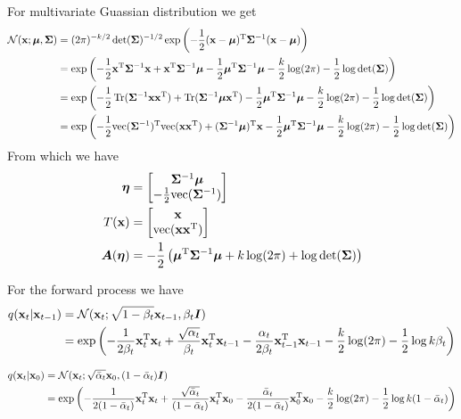 For multivariate Guassian distribution we get \cite{escudero_multivariate_2020}
\begin{align*}
    \mathcal{N}({\mathbf{x}} ; {\bm{\mu}}, {\bm{\Sigma}})
    &= (2 \pi)^{-k / 2} \det({\bm{\Sigma}})^{-1 / 2} \exp \left(-\frac{1}{2}({\mathbf{x}}-{\bm{\mu}})^{\mathrm{T}} {\bm{\Sigma}}^{-1}({\mathbf{x}} - {\bm{\mu}})\right) \\
    &= \exp \left(-\frac{1}{2}{\mathbf{x}}^{\mathrm{T}} {\bm{\Sigma}}^{-1} {\mathbf{x}} + {\mathbf{x}}^{\mathrm{T}} {\bm{\Sigma}}^{-1} {\bm{\mu}} - \frac{1}{2}{\bm{\mu}}^{\mathrm{T}} {\bm{\Sigma}}^{-1} {\bm{\mu}} - \frac{k}{2} \log (2 \pi) - \frac{1}{2} \log \det({\bm{\Sigma}}) \right) \\
    &= \exp \left(-\frac{1}{2} \operatorname{Tr}({\bm{\Sigma}}^{-1} {\mathbf{x}} {\mathbf{x}}^{\mathrm{T}} ) + \operatorname{Tr}( {\bm{\Sigma}}^{-1} {\bm{\mu}} {\mathbf{x}}^{\mathrm{T}} ) - \frac{1}{2}{\bm{\mu}}^{\mathrm{T}} {\bm{\Sigma}}^{-1} {\bm{\mu}} - \frac{k}{2} \log (2 \pi) - \frac{1}{2} \log \det({\bm{\Sigma}}) \right) \\
    &= \exp \left(-\frac{1}{2} \mathrm{vec}({\bm{\Sigma}}^{-1})^{\mathrm{T}} \mathrm{vec}({\mathbf{x}} {\mathbf{x}}^{\mathrm{T}} ) + ({\bm{\Sigma}}^{-1} {\bm{\mu}})^{\mathrm{T}} {\mathbf{x}} - \frac{1}{2}{\bm{\mu}}^{\mathrm{T}} {\bm{\Sigma}}^{-1} {\bm{\mu}} - \frac{k}{2} \log (2 \pi) - \frac{1}{2} \log \det({\bm{\Sigma}}) \right) 
\end{align*}
From which we have 
\begin{align*}
    \bm{\eta} &= \begin{bmatrix}
        {\bm{\Sigma}}^{-1} {\bm{\mu}} \\
        -\frac{1}{2} \mathrm{vec}({\bm{\Sigma}}^{-1})
    \end{bmatrix} \\
    T({\mathbf{x}}) &= \begin{bmatrix}
        {\mathbf{x}} \\
        \mathrm{vec}({\mathbf{x}} {\mathbf{x}}^{\mathrm{T}} )
    \end{bmatrix} \\
    {\bm{A}}(\bm{\eta}) &= - \frac{1}{2} \left( {\bm{\mu}}^{\mathrm{T}} {\bm{\Sigma}}^{-1} {\bm{\mu}} + k \log (2 \pi) + \log \det({\bm{\Sigma}})\right)
\end{align*}

For the forward process we have
\begin{align*}
    q({\mathbf{x}}_{t} | {\mathbf{x}}_{t-1}) &= \mathcal{N}({\mathbf{x}}_{t}; \sqrt{1-\beta_t} {\mathbf{x}}_{t-1}, \beta_t {\bm{I}}) \\
    &= \exp \left(-\frac{1}{2\beta_t} {\mathbf{x}}_t^{\mathrm{T}} {\mathbf{x}}_t + \frac{\sqrt{\alpha_t}}{\beta_t} {\mathbf{x}}_t^{\mathrm{T}} {\mathbf{x}}_{t-1} - \frac{\alpha_t}{2\beta_t}{\mathbf{x}}_{t-1}^{\mathrm{T}} {\mathbf{x}}_{t-1} - \frac{k}{2} \log (2 \pi) - \frac{1}{2} \log k \beta_t \right) 
\end{align*} 

\begin{align*}
    q({\mathbf{x}}_t | {\mathbf{x}}_0) &= \mathcal{N}({\mathbf{x}}_t; \sqrt{\bar{\alpha}_t} {\mathbf{x}}_0, (1 - \bar{\alpha}_t) {\bm{I}}) \\
    &= \exp \left(-\frac{1}{2(1 - \bar{\alpha}_t)} {\mathbf{x}}_t^{\mathrm{T}} {\mathbf{x}}_t + \frac{\sqrt{\bar{\alpha}_t}}{(1 - \bar{\alpha}_t)} {\mathbf{x}}_t^{\mathrm{T}} {\mathbf{x}}_{0} - \frac{\bar{\alpha}_t}{2(1 - \bar{\alpha}_t)}{\mathbf{x}}_{0}^{\mathrm{T}} {\mathbf{x}}_{0} - \frac{k}{2} \log (2 \pi) - \frac{1}{2} \log k (1 - \bar{\alpha}_t) \right) 
\end{align*}

